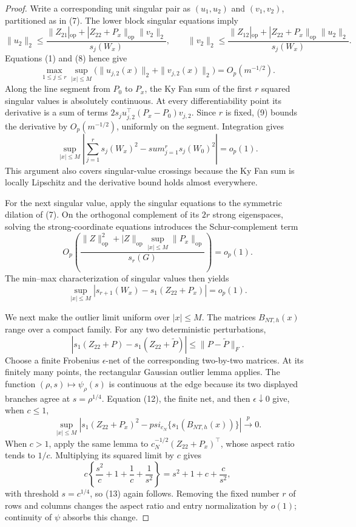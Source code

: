 \documentclass{article}
\begin{document}
\begin{proof}
Write a corresponding unit singular pair as \((u_1,u_2)\) and \((v_1,v_2)\), partitioned as in (7).  The lower block singular equations imply
\[
 \|u_2\|_2\leq
 \frac{\|Z_{21}|_{\mathrm{op}}+|Z_{22}+P_x\|_{\mathrm{op}}\|v_2\|_2}{s_j(W_x)},
 \qquad
 \|v_2\|_2\leq
 \frac{\|Z_{12}|_{\mathrm{op}}+|Z_{22}+P_x\|_{\mathrm{op}}\|u_2\|_2}{s_j(W_x)}.
\]
Equations (1) and (8) hence give
\[
 \max_{1\leq j\leq r}\sup_{|x|\leq M}
 \bigl(\|u_{j,2}(x)\|_2+\|v_{j,2}(x)\|_2\bigr)
 =O_p(m^{-1/2}). \tag{9}
\]
Along the line segment from \(P_0\) to \(P_x\), the Ky Fan sum of the first \(r\) squared singular values is absolutely continuous.  At every differentiability point its derivative is a sum of terms
\(2s_j u_{j,2}^{\top}(P_x-P_0)v_{j,2}\).  Since \(r\) is fixed, (9) bounds the derivative by \(O_p(m^{-1/2})\), uniformly on the segment.  Integration gives
\[
 \sup_{|x|\leq M}\left|
 \sum_{j=1}^r s_j(W_x)^2-sum_{j=1}^r s_j(W_0)^2
 \right|=o_p(1). \tag{10}
\]
This argument also covers singular-value crossings because the Ky Fan sum is locally Lipschitz and the derivative bound holds almost everywhere.

For the next singular value, apply the singular equations to the symmetric dilation of (7).  On the orthogonal complement of its \(2r\) strong eigenspaces, solving the strong-coordinate equations introduces the Schur-complement term
\[
 O_p\!\left(\frac{\|Z\|_{\mathrm{op}}^2+|Z\|_{\mathrm{op}}\sup_{|x|\leq M}\|P_x\|_{\mathrm{op}}}
 {s_r(G)}\right)=o_p(1).
\]
The min--max characterization of singular values then yields
\[
 \sup_{|x|\leq M}
 \left|s_{r+1}(W_x)-s_1(Z_{22}+P_x)\right|=o_p(1). \tag{11}
\]

We next make the outlier limit uniform over \(|x|\leq M\).  The matrices \(B_{NT,h}(x)\) range over a compact family.  For any two deterministic perturbations,
\[
 |s_1(Z_{22}+P)-s_1(Z_{22}+\widetilde P)|
 \leq\|P-\widetilde P\|_F. \tag{12}
\]
Choose a finite Frobenius \(\epsilon\)-net of the corresponding two-by-two matrices.  At its finitely many points, the rectangular Gaussian outlier lemma applies.  The function \((\rho,s)\mapsto\psi_\rho(s)\) is continuous at the edge because its two displayed branches agree at \(s=\rho^{1/4}\).  Equation (12), the finite net, and then \(\epsilon\downarrow0\) give, when \(c\leq1\),
\[
 \sup_{|x|\leq M}\left|
 s_1(Z_{22}+P_x)^2-psi_{c_N}\{s_1(B_{NT,h}(x))\}
 \right|\xrightarrow{p}0. \tag{13}
\]
When \(c>1\), apply the same lemma to \(c_N^{-1/2}(Z_{22}+P_x)^{\top}\), whose aspect ratio tends to \(1/c\).  Multiplying its squared limit by \(c\) gives
\[
 c\left\{\frac{s^2}{c}+1+\frac1c+\frac1{s^2}\right\}
 =s^2+1+c+\frac c{s^2},
\]
with threshold \(s=c^{1/4}\), so (13) again follows.  Removing the fixed number \(r\) of rows and columns changes the aspect ratio and entry normalization by \(o(1)\); continuity of \(\psi\) absorbs this change.


\end{proof}
\end{document}
